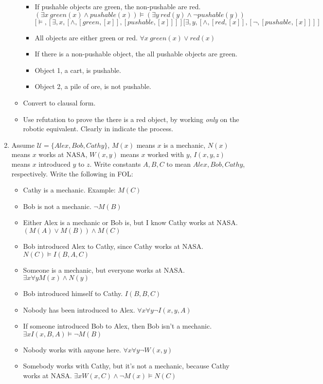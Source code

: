 \documentclass{article}
\begin{document}
\begin{enumerate}
\begin{itemize}
\begin{itemize}
\item If pushable objects are green, the non-pushable are red. \newline
$(\exists x\ green(x) \wedge pushable(x)) \models (\exists y\ red(y) \wedge \neg pushable(y))$ \newline
$[\models, [\exists, x, [\wedge,[green,[x]],[pushable,[x]]]] [\exists, y, [\wedge,[red,[x]],[\neg, [pushable,[x]]]]$
\item All objects are either green or red. \newline
$\forall x \ green(x) \vee red(x)$
\item If there is a non-pushable object, the all pushable objects are green.
\item Object 1, a cart, is pushable.
\item Object 2, a pile of ore, is not pushable.
\end{itemize}
\item Convert to clausal form.
\item Use refutation to prove the there is a red object, by working {\it only} on the robotic equivalent.  Clearly in indicate the process.
\end{itemize}
\item Assume $\mathcal{U} = \{Alex, Bob, Cathy\}$, $M(x)$ means $x$ is a mechanic, $N(x)$ means $x$ works at NASA, $W(x,y)$ means $x$ worked with $y$, $I(x,y,z)$ means $x$ introduced $y$ to $z$.  Write constants $A,B,C$ to mean $Alex, Bob, Cathy$, respectively. Write the following in FOL:
\begin{itemize}
\item Cathy is a mechanic. Example:  $M(C)$
\item Bob is not a mechanic. \newline
$\neg M(B)$
\item Either Alex is a mechanic or Bob is, but I know Cathy works at NASA. \newline
$(M(A) \vee M(B)) \wedge M(C)$
\item Bob introduced Alex to Cathy, since Cathy works at NASA. \newline
$N(C) \models I(B,A,C)$
\item Someone is a mechanic, but everyone works at NASA.
$\exists x \forall y M(x) \wedge N(y)$
\item Bob introduced himself to Cathy. \newline
$I(B,B,C)$
\item Nobody has been introduced to Alex. \newline
$\forall x \forall y \neg I(x,y,A)$ 
\item If someone introduced Bob to Alex, then Bob isn't a mechanic. \newline
$\exists x I(x,B,A) \models \neg M(B)$
\item Nobody works with anyone here. \newline
$\forall x \forall y \neg W(x,y)$
\item Somebody works with Cathy, but it's not a mechanic, because Cathy works at NASA. \newline
$\exists x W(x,C) \wedge \neg M(x) \models N(C)$
\end{itemize}
\end{enumerate}
\end{document}
